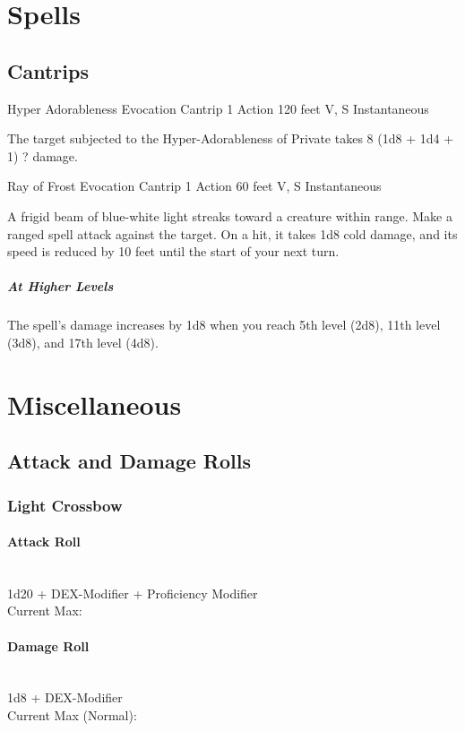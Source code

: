 {\section*{Spells}
\subsection*{Cantrips}

\DndSpellHeader
	{Hyper Adorableness}
	{Evocation Cantrip}
	{1 Action}
	{120 feet}
	{V, S}
	{Instantaneous}

The target subjected to the Hyper-Adorableness of Private takes 8 (1d8 + 1d4 + 1) ? damage.

\DndSpellHeader
	{Ray of Frost}
	{Evocation Cantrip}
	{1 Action}
	{60 feet}
	{V, S}
	{Instantaneous}

A frigid beam of blue-white light streaks toward a creature within range. Make a ranged spell attack against the target. On a hit, it takes 1d8 cold damage, and its speed is reduced by 10 feet until the start of your next turn.

\subparagraph*{At Higher Levels} The spell’s damage increases by 1d8 when you reach 5th level (2d8), 11th level (3d8), and 17th level (4d8).

\section*{Miscellaneous}
\subsection*{Attack and Damage Rolls}
\subsubsection*{Light Crossbow}
\paragraph*{Attack Roll}\hfill\\
1d20 + DEX-Modifier + Proficiency Modifier \\
\indent Current Max: 
\paragraph*{Damage Roll}\hfill\\
1d8 + DEX-Modifier\\
\indent Current Max (Normal):  \\
}